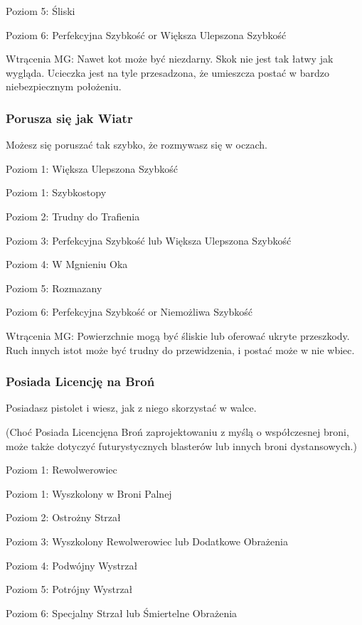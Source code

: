 Poziom 5: Śliski

Poziom 6: Perfekcyjna Szybkość or  Większa Ulepszona Szybkość

Wtrącenia MG: Nawet kot może być niezdarny. Skok nie jest tak łatwy jak wygląda. Ucieczka jest na tyle przesadzona, że umieszcza postać w bardzo niebezpiecznym położeniu.

\subsubsection{Porusza się jak Wiatr}

Możesz się poruszać tak szybko, że rozmywasz się w oczach.

Poziom 1: Większa Ulepszona Szybkość

Poziom 1: Szybkostopy

Poziom 2: Trudny do Trafienia

Poziom 3: Perfekcyjna Szybkość lub  Większa Ulepszona Szybkość

Poziom 4: W Mgnieniu Oka

Poziom 5: Rozmazany

Poziom 6: Perfekcyjna Szybkość or Niemożliwa Szybkość

Wtrącenia MG: Powierzchnie mogą być śliskie lub oferować ukryte przeszkody. Ruch innych istot może być trudny do przewidzenia, i postać może w nie wbiec.

\subsubsection{Posiada Licencję na Broń}

Posiadasz pistolet i wiesz, jak z niego skorzystać w walce. 

(Choć Posiada Licencjęna Broń zaprojektowaniu z myślą o współczesnej broni, może także dotyczyć futurystycznych blasterów lub innych broni dystansowych.)

Poziom 1: Rewolwerowiec

Poziom 1: Wyszkolony w Broni Palnej

Poziom 2: Ostrożny Strzał

Poziom 3: Wyszkolony Rewolwerowiec lub Dodatkowe Obrażenia

Poziom 4: Podwójny Wystrzał

Poziom 5: Potrójny Wystrzał

Poziom 6: Specjalny Strzał lub Śmiertelne Obrażenia

